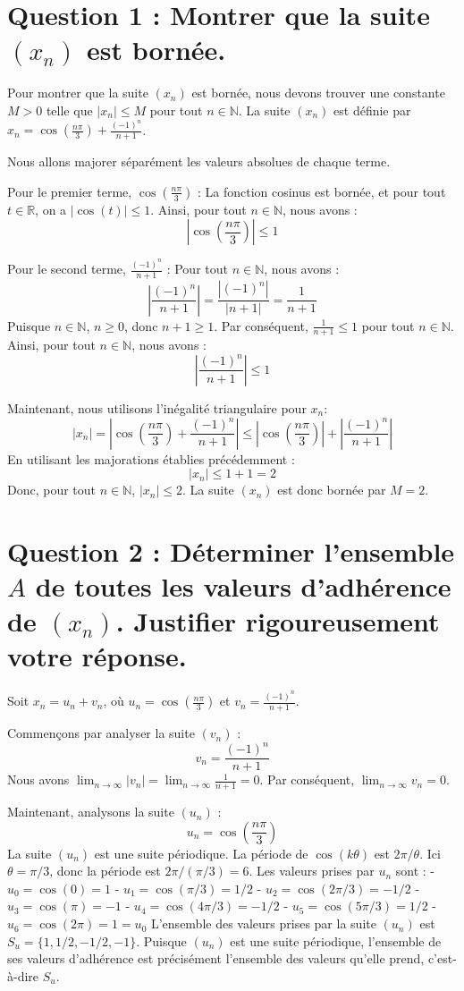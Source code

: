 \documentclass{report}
\begin{document}
\section*{Question 1 : Montrer que la suite $(x_n)$ est bornée.}

Pour montrer que la suite $(x_n)$ est bornée, nous devons trouver une constante $M > 0$ telle que $|x_n| \le M$ pour tout $n \in \mathbb{N}$.
La suite $(x_n)$ est définie par $x_n = \cos\left(\frac{n\pi}{3}\right) + \frac{(-1)^n}{n+1}$.

Nous allons majorer séparément les valeurs absolues de chaque terme.

Pour le premier terme, $\cos\left(\frac{n\pi}{3}\right)$ :
La fonction cosinus est bornée, et pour tout $t \in \mathbb{R}$, on a $|\cos(t)| \le 1$.
Ainsi, pour tout $n \in \mathbb{N}$, nous avons :
$$\left|\cos\left(\frac{n\pi}{3}\right)\right| \le 1$$

Pour le second terme, $\frac{(-1)^n}{n+1}$ :
Pour tout $n \in \mathbb{N}$, nous avons :
$$\left|\frac{(-1)^n}{n+1}\right| = \frac{|(-1)^n|}{|n+1|} = \frac{1}{n+1}$$
Puisque $n \in \mathbb{N}$, $n \ge 0$, donc $n+1 \ge 1$.
Par conséquent, $\frac{1}{n+1} \le 1$ pour tout $n \in \mathbb{N}$.
Ainsi, pour tout $n \in \mathbb{N}$, nous avons :
$$\left|\frac{(-1)^n}{n+1}\right| \le 1$$

Maintenant, nous utilisons l'inégalité triangulaire pour $x_n$:
$$|x_n| = \left|\cos\left(\frac{n\pi}{3}\right) + \frac{(-1)^n}{n+1}\right| \le \left|\cos\left(\frac{n\pi}{3}\right)\right| + \left|\frac{(-1)^n}{n+1}\right|$$
En utilisant les majorations établies précédemment :
$$|x_n| \le 1 + 1 = 2$$
Donc, pour tout $n \in \mathbb{N}$, $|x_n| \le 2$.
La suite $(x_n)$ est donc bornée par $M=2$.

\section*{Question 2 : Déterminer l'ensemble $A$ de toutes les valeurs d'adhérence de $(x_n)$. Justifier rigoureusement votre réponse.}

Soit $x_n = u_n + v_n$, où $u_n = \cos\left(\frac{n\pi}{3}\right)$ et $v_n = \frac{(-1)^n}{n+1}$.

Commençons par analyser la suite $(v_n)$ :
$$v_n = \frac{(-1)^n}{n+1}$$
Nous avons $\lim_{n \to \infty} |v_n| = \lim_{n \to \infty} \frac{1}{n+1} = 0$.
Par conséquent, $\lim_{n \to \infty} v_n = 0$.

Maintenant, analysons la suite $(u_n)$ :
$$u_n = \cos\left(\frac{n\pi}{3}\right)$$
La suite $(u_n)$ est une suite périodique. La période de $\cos(k\theta)$ est $2\pi/\theta$. Ici $\theta = \pi/3$, donc la période est $2\pi/(\pi/3) = 6$.
Les valeurs prises par $u_n$ sont :
- $u_0 = \cos(0) = 1$
- $u_1 = \cos(\pi/3) = 1/2$
- $u_2 = \cos(2\pi/3) = -1/2$
- $u_3 = \cos(\pi) = -1$
- $u_4 = \cos(4\pi/3) = -1/2$
- $u_5 = \cos(5\pi/3) = 1/2$
- $u_6 = \cos(2\pi) = 1 = u_0$
L'ensemble des valeurs prises par la suite $(u_n)$ est $S_u = \{1, 1/2, -1/2, -1\}$.
Puisque $(u_n)$ est une suite périodique, l'ensemble de ses valeurs d'adhérence est précisément l'ensemble des valeurs qu'elle prend, c'est-à-dire $S_u$.
\end{document}

